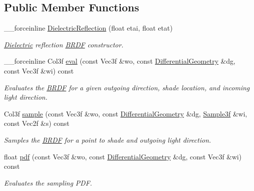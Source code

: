 \subsection*{Public Member Functions}
\begin{DoxyCompactItemize}
\item 
\_\-\_\-forceinline \hyperlink{classembree_1_1_dielectric_reflection_aae6511b180df689eab217ec51e0ed68c}{DielectricReflection} (float etai, float etat)
\begin{DoxyCompactList}\small\item\em \hyperlink{classembree_1_1_dielectric}{Dielectric} reflection \hyperlink{classembree_1_1_b_r_d_f}{BRDF} constructor. \item\end{DoxyCompactList}\item 
\_\-\_\-forceinline Col3f \hyperlink{classembree_1_1_dielectric_reflection_a7c45f2d6768e160f5602e62ec18a71f1}{eval} (const Vec3f \&wo, const \hyperlink{structembree_1_1_differential_geometry}{DifferentialGeometry} \&dg, const Vec3f \&wi) const 
\begin{DoxyCompactList}\small\item\em Evaluates the \hyperlink{classembree_1_1_b_r_d_f}{BRDF} for a given outgoing direction, shade location, and incoming light direction. \item\end{DoxyCompactList}\item 
Col3f \hyperlink{classembree_1_1_dielectric_reflection_a292d787b936ce461323aaa9857b4390b}{sample} (const Vec3f \&wo, const \hyperlink{structembree_1_1_differential_geometry}{DifferentialGeometry} \&dg, \hyperlink{structembree_1_1_sample}{Sample3f} \&wi, const Vec2f \&s) const 
\begin{DoxyCompactList}\small\item\em Samples the \hyperlink{classembree_1_1_b_r_d_f}{BRDF} for a point to shade and outgoing light direction. \item\end{DoxyCompactList}\item 
float \hyperlink{classembree_1_1_dielectric_reflection_a0ea69a412cdd7eb4f4582c57b85b72d7}{pdf} (const Vec3f \&wo, const \hyperlink{structembree_1_1_differential_geometry}{DifferentialGeometry} \&dg, const Vec3f \&wi) const 
\begin{DoxyCompactList}\small\item\em Evaluates the sampling PDF. \item\end{DoxyCompactList}\end{DoxyCompactItemize}


